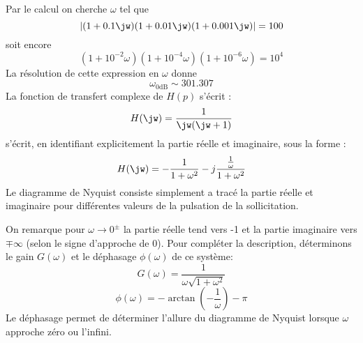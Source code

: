 Par le calcul on cherche $\omega$ tel que 
\[
\left|(1+0.1\jw)(1+0.01\jw)(1+0.001\jw)\right|=100
\]
soit encore
\[
    (1+10^{-2}\omega)(1+10^{-4}\omega)(1+10^{-6}\omega)=10^4    
\]
La résolution de cette expression en $\omega$ donne
\[
    \omega_{0\si{\dB}}\sim301.307 
\]
La fonction de transfert complexe de $H(p)$ s'écrit :
\[
    H(\jw)=\dfrac{1}{\jw(\jw+1)}
\]
s'écrit, en identifiant explicitement la partie réelle et imaginaire, sous la 
forme :
\[
    H(\jw)=-\dfrac{1}{1+\omega^2}-j\dfrac{\frac{1}{\omega}}{1+\omega^2}
\]
Le diagramme de Nyquist consiste simplement a tracé la partie réelle et 
imaginaire pour différentes valeurs de la pulsation de la sollicitation.
\begin{figure}[!t]
    \centering
    
\end{figure}
On remarque pour $\omega\rightarrow0^\pm$ la partie réelle tend vers -1 et la 
partie imaginaire vers $\mp\infty$ (selon le signe d'approche de 0).
Pour compléter la description, déterminons le gain $G(\omega)$ et le déphasage 
$\phi(\omega)$ de ce système:
\[
    G(\omega)=\dfrac{1}{\omega\sqrt{1+\omega^2}}
\]
\[
    \phi(\omega)=-\arctan{\left(-\dfrac{1}{\omega}\right)}-\pi
\]
Le déphasage permet de déterminer l'allure du diagramme de Nyquist 
lorsque $\omega$ approche zéro ou l'infini. 

